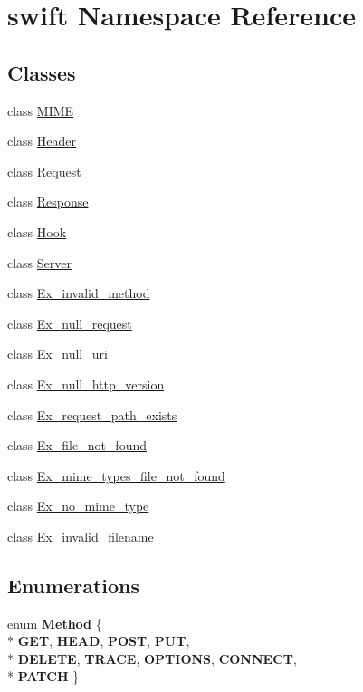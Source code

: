 \hypertarget{namespaceswift}{\section{swift Namespace Reference}
\label{namespaceswift}
}
\subsection*{Classes}
\begin{DoxyCompactItemize}
\item 
class \hyperlink{classswift_1_1_m_i_m_e}{M\-I\-M\-E}
\item 
class \hyperlink{classswift_1_1_header}{Header}
\item 
class \hyperlink{classswift_1_1_request}{Request}
\item 
class \hyperlink{classswift_1_1_response}{Response}
\item 
class \hyperlink{classswift_1_1_hook}{Hook}
\item 
class \hyperlink{classswift_1_1_server}{Server}
\item 
class \hyperlink{classswift_1_1_ex__invalid__method}{Ex\-\_\-invalid\-\_\-method}
\item 
class \hyperlink{classswift_1_1_ex__null__request}{Ex\-\_\-null\-\_\-request}
\item 
class \hyperlink{classswift_1_1_ex__null__uri}{Ex\-\_\-null\-\_\-uri}
\item 
class \hyperlink{classswift_1_1_ex__null__http__version}{Ex\-\_\-null\-\_\-http\-\_\-version}
\item 
class \hyperlink{classswift_1_1_ex__request__path__exists}{Ex\-\_\-request\-\_\-path\-\_\-exists}
\item 
class \hyperlink{classswift_1_1_ex__file__not__found}{Ex\-\_\-file\-\_\-not\-\_\-found}
\item 
class \hyperlink{classswift_1_1_ex__mime__types__file__not__found}{Ex\-\_\-mime\-\_\-types\-\_\-file\-\_\-not\-\_\-found}
\item 
class \hyperlink{classswift_1_1_ex__no__mime__type}{Ex\-\_\-no\-\_\-mime\-\_\-type}
\item 
class \hyperlink{classswift_1_1_ex__invalid__filename}{Ex\-\_\-invalid\-\_\-filename}
\end{DoxyCompactItemize}
\subsection*{Enumerations}
\begin{DoxyCompactItemize}
\item 
enum {\bfseries Method} \{ \\*
{\bfseries G\-E\-T}, 
{\bfseries H\-E\-A\-D}, 
{\bfseries P\-O\-S\-T}, 
{\bfseries P\-U\-T}, 
\\*
{\bfseries D\-E\-L\-E\-T\-E}, 
{\bfseries T\-R\-A\-C\-E}, 
{\bfseries O\-P\-T\-I\-O\-N\-S}, 
{\bfseries C\-O\-N\-N\-E\-C\-T}, 
\\*
{\bfseries P\-A\-T\-C\-H}
 \}
\end{DoxyCompactItemize}
